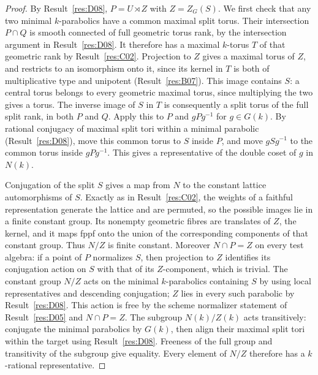 \documentclass[11pt,a4paper,openany,oneside]{book}
\theoremstyle{resultstyle}
\theoremstyle{definition}
\numberwithin{equation}{chapter}
\begin{document}
\begin{proof}
By Result~\ref{res:D08}, \(P=U\rtimes Z\) with
\(Z=Z_G(S)\). We first check that any two minimal
\(k\)-parabolics have a common maximal split torus.
Their intersection \(P\cap Q\) is smooth connected
of full geometric torus rank, by the intersection
argument in Result~\ref{res:D08}. It therefore has
a maximal \(k\)-torus \(T\) of that geometric rank
by Result~\ref{res:C02}. Projection to \(Z\) gives a
maximal torus of \(Z\), and restricts to an isomorphism
onto it, since its kernel in \(T\) is both of
multiplicative type and unipotent
(Result~\ref{res:B07}). This image contains \(S\):
a central torus belongs to every geometric maximal
torus, since multiplying the two gives a torus.
The inverse image of \(S\) in \(T\) is consequently
a split torus of the full split rank, in both \(P\)
and \(Q\). Apply this to \(P\) and \(gPg^{-1}\)
for \(g\in G(k)\). By rational conjugacy of maximal
split tori within a minimal parabolic
(Result~\ref{res:D08}), move this common torus to
\(S\) inside \(P\), and move \(gSg^{-1}\) to the
common torus inside \(gPg^{-1}\). This gives a
representative of the double coset of \(g\) in \(N(k)\).

Conjugation of the split \(S\) gives a map from \(N\)
to the constant lattice automorphisms of \(S\).
Exactly as in Result~\ref{res:C02}, the weights of a
faithful representation generate the lattice and are
permuted, so the possible images lie in a finite
constant group. Its nonempty geometric fibres are
translates of \(Z\), the kernel, and it maps fppf onto
the union of the corresponding components of that
constant group. Thus \(N/Z\) is finite constant.
Moreover \(N\cap P=Z\) on every test algebra:
if a point of \(P\) normalizes \(S\), then projection
to \(Z\) identifies its conjugation action on \(S\)
with that of its \(Z\)-component, which is trivial.
The constant group \(N/Z\) acts on the minimal
\(k\)-parabolics containing \(S\) by using local
representatives and descending conjugation; \(Z\)
lies in every such parabolic by Result~\ref{res:D08}.
This action is free by the scheme normalizer statement
of Result~\ref{res:D05} and \(N\cap P=Z\).
The subgroup \(N(k)/Z(k)\) acts transitively: conjugate
the minimal parabolics by \(G(k)\), then align their
maximal split tori within the target using
Result~\ref{res:D08}. Freeness of the full group and
transitivity of the subgroup give equality. Every
element of \(N/Z\) therefore has a \(k\)-rational
representative.


\end{proof}
\end{document}
